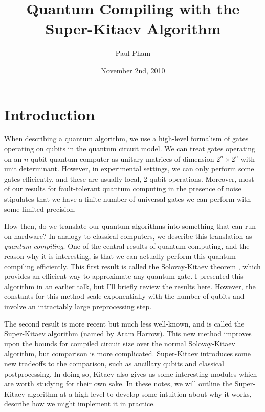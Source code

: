 \documentclass{article}
\title{Quantum Compiling with the Super-Kitaev Algorithm}
\date{November 2nd, 2010}
\author{Paul Pham}
\theoremstyle{plain}
\begin{document}
\newcommand{\braket}[2]{\langle #1|#2 \rangle}
\newcommand{\normtwo}{\frac{1}{\sqrt{2}}}
\newcommand{\norm}[1]{\parallel #1 \parallel}

\maketitle

\section{Introduction}

When describing a quantum algorithm, we use a high-level formalism of
gates operating on qubits in the quantum circuit model.
We can treat gates operating on an $n$-qubit quantum computer as unitary
matrices of dimension $2^n \times 2^n$ with unit determinant.
However, in experimental settings,
we can only perform some gates efficiently, and these are usually local,
2-qubit operations. Moreover, most of our results for fault-tolerant
quantum computing in the presence of noise stipulates that we have a finite
number of universal gates we can perform with some limited precision.

How then, do we translate our quantum algorithms into something that can run
on hardware? In analogy to classical computers, we describe this translation
as {\em quantum compiling}. One of the central results of quantum computing,
and the reason why it is interesting, is that we can actually perform this
quantum compiling efficiently. This first result is called the
Solovay-Kitaev theorem \cite{Dawson2005}, which provides an efficient way to
approximate any quantum gate. I presented this algorithm in an earlier talk, but
I'll briefly review the results here. However, the constants for this method
scale exponentially with the number of qubits and involve an intractably
large preprocessing step.

The second result is more recent but much less well-known, and is called
the Super-Kitaev algorithm (named by Aram Harrow). This new method improves upon
the bounds for compiled circuit size over the normal Solovay-Kitaev algorithm,
but comparison is more complicated. Super-Kitaev introduces some new tradeoffs to the
comparison, such as ancillary qubits and classical postprocessing. In doing so,
Kitaev also gives us some interesting modules which are worth studying for
their own sake. In these notes, we will outline the Super-Kitaev algorithm at
a high-level to develop some intuition about why it works, describe how we 
might implement it in practice.
\end{document}
